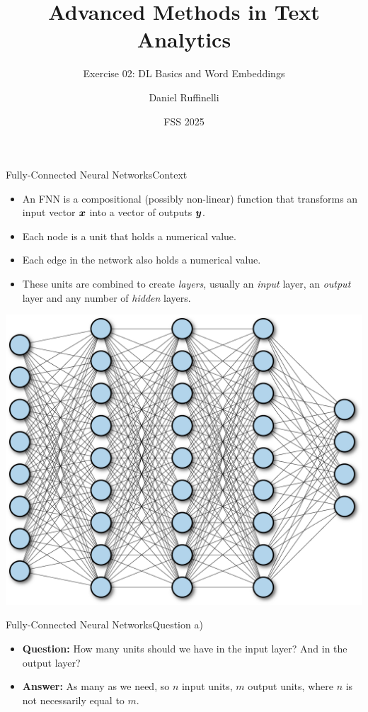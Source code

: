 \documentclass[t]{beamer}
\title[Write your short title here]{Advanced Methods in Text Analytics}
\subtitle{Exercise 02: DL Basics and Word Embeddings}
\author{Daniel Ruffinelli}
\institute{University of Mannheim}
\date{FSS 2025}
\begin{document}

\begin{frame}
    \titlepage{}
\end{frame}

\begin{frame}{Fully-Connected Neural Networks}{Context}
    \begin{itemize}
        \item An FNN is a compositional (possibly non-linear) function that
              transforms an input vector ${\boldsymbol{x}}$ into a vector of outputs ${\boldsymbol{y}}$.
        \item Each node is a unit that holds a numerical value.
        \item Each edge in the network also holds a numerical value.
        \item These units are combined to create \emph{layers}, usually an
              \emph{input} layer, an \emph{output} layer and any number of
              \emph{hidden} layers.
    \end{itemize}
    \vspace{0.5cm}
    \centering
    \includegraphics[scale=0.5]{img/fnn_1.png}
\end{frame}

\begin{frame}{Fully-Connected Neural Networks}{Question a)}
    \begin{itemize}
        \item \textbf{Question:} How many units should we have in the input
              layer? And in the output layer?
              \pause
        \item \textbf{Answer:} As many as we need, so $n$ input units, $m$
              output units, where $n$ is not necessarily equal to $m$.
    \end{itemize}
\end{frame}
\end{document}
